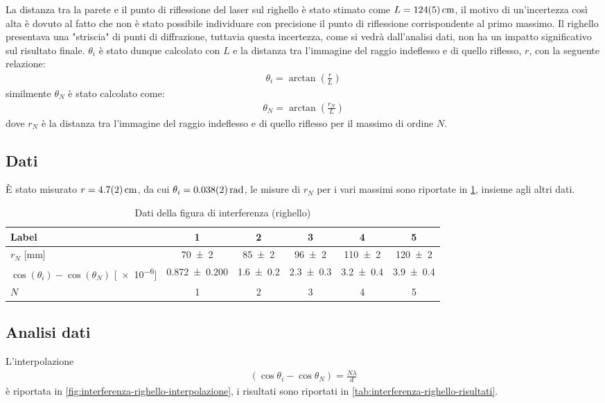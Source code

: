 \documentclass[a4paper]{article}
\begin{document}
La distanza tra la parete e il punto di riflessione del laser sul righello è stato stimato come $L=\SI{124 \pm 5}{\centi\meter}$, il motivo di un'incertezza così alta è dovuto al fatto che non è stato possibile individuare con precisione il punto di riflessione corrispondente al primo massimo. Il righello presentava una "striscia" di punti di diffrazione, tuttavia questa incertezza, come si vedrà dall'analisi dati, non ha un impatto significativo sul risultato finale. $\theta_i$ è stato dunque calcolato con $L$ e la distanza tra l'immagine del raggio indeflesso e di quello riflesso, $r$, con la seguente relazione:
\begin{align}   
    \theta_i = \arctan\left(\frac{r}{L}\right)
\end{align}
similmente $\theta_N$ è stato calcolato come:
\begin{align}
    \theta_N = \arctan\left(\frac{r_N}{L}\right)
\end{align}
dove $r_N$ è la distanza tra l'immagine del raggio indeflesso e di quello riflesso per il massimo di ordine $N$.
\subsection{Dati}
È stato misurato $r=\SI{4.7 \pm 0.2}{\centi\meter}$, da cui $\theta_i=\SI{0.038 \pm 0.002}{\radian}$, le misure di $r_N$ per i vari massimi sono riportate in \cref{tab:interferenza-righello}, insieme agli altri dati.

\begin{table}[htbp]
\caption{Dati della figura di interferenza (righello)}
\label{tab:interferenza-righello}
\centering
\begin{tabular}{|l|ccccc|}
\hline
Label & 1 & 2 & 3 & 4 & 5 \\\hline\hline
$r_N$ [\si{\milli\meter}]& \num{70 \pm 2} & \num{85 \pm 2} & \num{96 \pm 2} & \num{110 \pm 2} & \num{120 \pm 2} \\\hline
$\cos(\theta_i) - \cos(\theta_N)$ [\num{e-6}]& \num{0.872 \pm 0.200} & \num{1.6 \pm 0.2} & \num{2.3 \pm 0.3} & \num{3.2 \pm 0.4} & \num{3.9 \pm 0.4} \\\hline
$N$ & 1 & 2 & 3 & 4 & 5 \\\hline
\end{tabular}
\end{table}

\subsection{Analisi dati}
L'interpolazione
\begin{align}
    (\cos\theta_i - \cos\theta_N) = \frac{N\lambda}{d}
\end{align}
è riportata in \cref{fig:interferenza-righello-interpolazione}, i risultati sono riportati in \cref{tab:interferenza-righello-risultati}.
\end{document}
